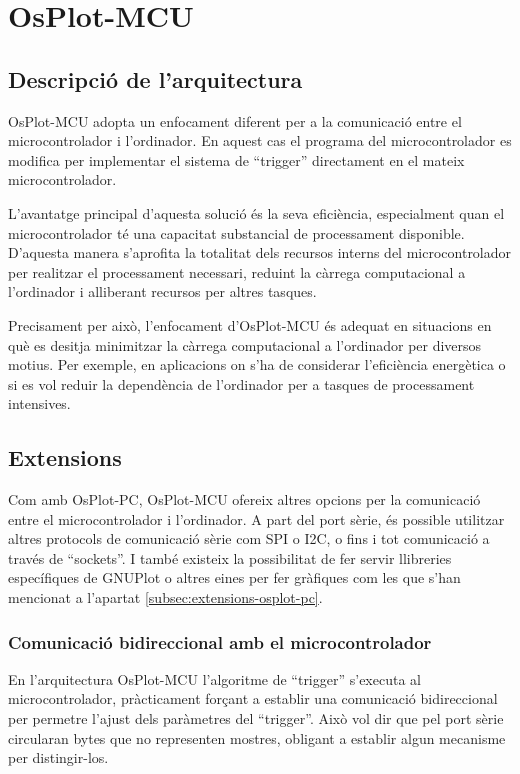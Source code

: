 \documentclass{tfgitic}[2023/06/30]
\begin{document}
\section{OsPlot-MCU}

\subsection{Descripció de l'arquitectura}

OsPlot-MCU adopta un enfocament diferent per a la comunicació entre el
microcontrolador i l'ordinador. En aquest cas el programa del
microcontrolador es modifica per implementar el sistema de ``trigger''
directament en el mateix microcontrolador.

L'avantatge principal d'aquesta solució és la seva eficiència,
especialment quan el microcontrolador té una capacitat substancial de
processament disponible. D'aquesta manera s'aprofita la totalitat dels
recursos interns del microcontrolador per realitzar el processament
necessari, reduint la càrrega computacional a l'ordinador i alliberant
recursos per altres tasques.

Precisament per això, l'enfocament d'OsPlot-MCU és adequat en
situacions en què es desitja minimitzar la càrrega computacional a
l'ordinador per diversos motius. Per exemple, en aplicacions on s'ha
de considerar l'eficiència energètica o si es vol reduir la
dependència de l'ordinador per a tasques de processament intensives.

\subsection{Extensions}

Com amb OsPlot-PC, OsPlot-MCU ofereix altres opcions per la
comunicació entre el microcontrolador i l'ordinador. A part del port
sèrie, és possible utilitzar altres protocols de comunicació sèrie com
SPI o I2C, o fins i tot comunicació a través de ``sockets''. I també
existeix la possibilitat de fer servir llibreries específiques de
GNUPlot o altres eines per fer gràfiques com les que s'han mencionat a
l'apartat \ref{subsec:extensions-osplot-pc}.

\subsubsection{Comunicació bidireccional amb el microcontrolador}

En l'arquitectura OsPlot-MCU l'algoritme de ``trigger'' s'executa al
microcontrolador, pràcticament forçant a establir una comunicació
bidireccional per permetre l'ajust dels paràmetres del ``trigger''.
Això vol dir que pel port sèrie circularan bytes que no representen
mostres, obligant a establir algun mecanisme per distingir-los.
\end{document}
